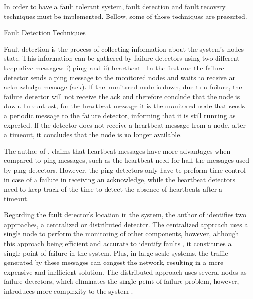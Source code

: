 In order to have a fault tolerant system, fault detection and fault recovery techniques must be implemented. Bellow, some of those techniques are presented.

\begin{Paragraph}{Fault Detection Techniques}
	
	Fault detection is the process of collecting information about the system’s nodes state. This information can be gathered by failure detectors using two different keep alive messages: i) ping; and ii) heartbeat \cite{Zaiter2013}. In the first one the failure detector sends a ping message to the monitored nodes and waits to receive an acknowledge message (ack). If the monitored node is down, due to a failure, the failure detector will not receive the ack and therefore conclude that the node is down. In contrast, for the heartbeat message it is the monitored node that sends a periodic message to the failure detector, informing that it is still running as expected. If the detector does not receive a heartbeat message from a node, after a timeout, it concludes that the node is no longer available.
	
	The author of \cite{Zaiter2013}, claims that heartbeat messages have more advantages when compared to ping messages, such as the heartbeat need for half the messages used by ping detectors. However, the ping detectors only have to preform time control in case of a failure in receiving an acknowledge, while the heartbeat detectors need to keep track of the time to detect the absence of heartbeats after a timeout.
	
	Regarding the fault detector’s location in the system, the author of \cite{kshir} identifies two approaches, a centralized or distributed detector. The centralized approach uses a single node to perform the monitoring of other components, however, although this approach being efficient and accurate to identify faults \cite{kshir}, it constitutes a single-point of failure in the system. Plus, in large-scale systems, the traffic generated by these messages can congest the network, resulting in a more expensive and inefficient solution. The distributed approach uses several nodes as failure detectors, which eliminates the single-point of failure problem, however, introduces more complexity to the system \cite{Zaiter2013}. 
	
	
\end{Paragraph}

